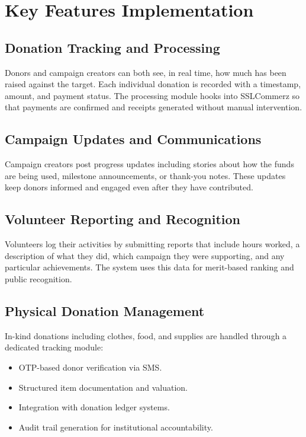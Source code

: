 \documentclass{thesis-library}
\begin{document}
\section{Key Features Implementation}

\subsection{Donation Tracking and Processing}
Donors and campaign creators can both see, in real time, how much has been raised against the target. Each individual donation is recorded with a timestamp, amount, and payment status. The processing module hooks into SSLCommerz so that payments are confirmed and receipts generated without manual intervention.

\subsection{Campaign Updates and Communications}
Campaign creators post progress updates including stories about how the funds are being used, milestone announcements, or thank-you notes. These updates keep donors informed and engaged even after they have contributed.

\subsection{Volunteer Reporting and Recognition}
Volunteers log their activities by submitting reports that include hours worked, a description of what they did, which campaign they were supporting, and any particular achievements. The system uses this data for merit-based ranking and public recognition.

\subsection{Physical Donation Management}
In-kind donations including clothes, food, and supplies are handled through a dedicated tracking module:
\begin{itemize}
    \item OTP-based donor verification via SMS.
    \item Structured item documentation and valuation.
    \item Integration with donation ledger systems.
    \item Audit trail generation for institutional accountability.
\end{itemize}
\end{document}
